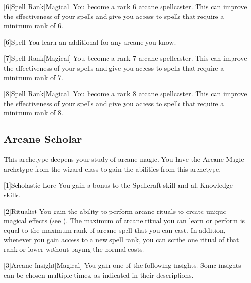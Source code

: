         [6]{Spell Rank}[Magical] You become a rank 6 arcane spellcaster.
        This can improve the effectiveness of your spells and give you access to spells that require a minimum rank of 6.

        [6]{Spell} You learn an additional  for any arcane  you know.

        [7]{Spell Rank}[Magical] You become a rank 7 arcane spellcaster.
        This can improve the effectiveness of your spells and give you access to spells that require a minimum rank of 7.

        [8]{Spell Rank}[Magical] You become a rank 8 arcane spellcaster.
        This can improve the effectiveness of your spells and give you access to spells that require a minimum rank of 8.

    \subsection{Arcane Scholar}
        This archetype deepens your study of arcane magic.
        You have the Arcane Magic archetype from the wizard class to gain the abilities from this archetype.

        [1]{Scholastic Lore} You gain a  bonus to the Spellcraft skill and all Knowledge skills.

        [2]{Ritualist} You gain the ability to perform arcane rituals to create unique magical effects (see ).
        The maximum  of arcane ritual you can learn or perform is equal to the maximum rank of arcane spell that you can cast.
        In addition, whenever you gain access to a new spell rank, you can scribe one ritual of that rank or lower without paying the normal costs.

        [3]{Arcane Insight}[Magical]
        You gain one of the following insights.
        Some insights can be chosen multiple times, as indicated in their descriptions.

